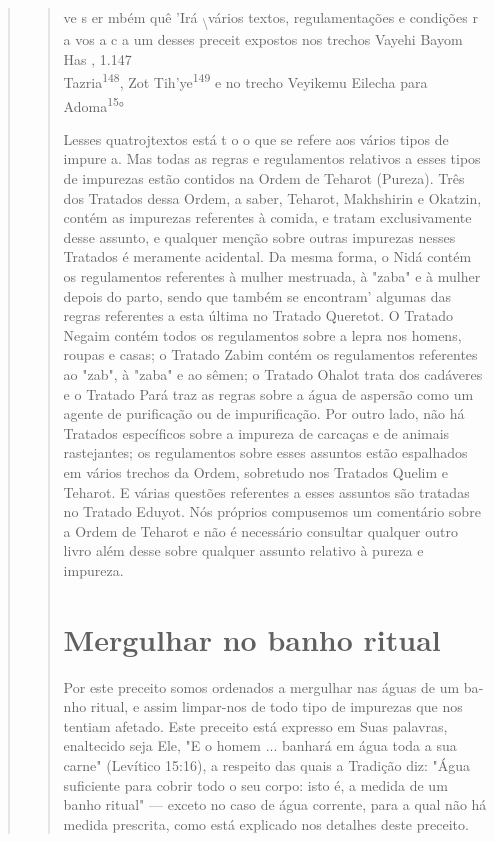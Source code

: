 \begin{quote}
\begin{quote}
ve s er mbém quê 'Irá \textsubscript{\textbackslash{}}vários textos,
regulamentações e condições r a vos a c a um desses preceit expostos nos
trechos Vayehi Bayom Has , 1.147\\
Tazria\textsuperscript{148}, Zot Tih'ye\textsuperscript{149} e no trecho
Veyikemu Eilecha para Adoma\textsuperscript{15}°

Les­ses quatrojtextos está t o o que se refere aos vários tipos de
impure a. Mas todas as regras e regulamentos relativos a esses tipos de
impurezas estão conti­dos na Ordem de Teharot (Pureza). Três dos
Tratados dessa Ordem, a saber, Teharot, Makhshirin e Okatzin, contém as
impurezas referentes à comida, e tra­tam exclusivamente desse assunto, e
qualquer menção sobre outras impurezas nesses Tratados é meramente
acidental. Da mesma forma, o Nidá contém os regulamentos referentes à
mulher mestruada, à "zaba" e à mulher depois do parto, sendo que também
se encontram' algumas das regras referentes a esta úl­tima no Tratado
Queretot. O Tratado Negaim contém todos os regulamentos sobre a lepra
nos homens, roupas e casas; o Tratado Zabim contém os regula­mentos
referentes ao "zab", à "zaba" e ao sêmen; o Tratado Ohalot trata dos
cadáveres e o Tratado Pará traz as regras sobre a água de aspersão como
um agente de purificação ou de impurificação. Por outro lado, não há
Tratados es­pecíficos sobre a impureza de carcaças e de animais
rastejantes; os regulamen­tos sobre esses assuntos estão espalhados em
vários trechos da Ordem, sobre­tudo nos Tratados Quelim e Teharot. E
várias questões referentes a esses as­suntos são tratadas no Tratado
Eduyot. Nós próprios compusemos um comen­tário sobre a Ordem de Teharot
e não é necessário consultar qualquer outro livro além desse sobre
qualquer assunto relativo à pureza e impureza.

\section{Mergulhar no banho ritual}

Por este preceito somos ordenados a mergulhar nas águas de um ba­nho
ritual, e assim limpar-nos de todo tipo de impurezas que nos tentiam
afeta­do. Este preceito está expresso em Suas palavras, enaltecido seja
Ele, "E o ho­mem ... banhará em água toda a sua carne" (Levítico 15:16),
a respeito das quais a Tradição diz: "Água suficiente para cobrir todo o
seu corpo: isto é, a medida de um banho ritual" --- exceto no caso de
água corrente, para a qual não há medida prescrita, como está explicado
nos detalhes deste preceito.


\end{quote}
\end{quote}
